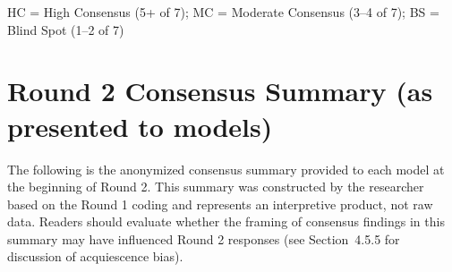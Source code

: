 \documentclass[preprint,review,12pt]{elsarticle}
\begin{document}
\begin{table}[htbp]
\centering
{}%

\vspace{0.5em}
\noindent\small HC = High Consensus (5+ of 7); MC = Moderate Consensus (3--4 of 7); BS = Blind Spot (1--2 of 7)
\end{table}


\section{Round 2 Consensus Summary (as presented to models)}
\label{sec:appendix_e}

The following is the anonymized consensus summary provided to each model at the beginning of Round 2. This summary was constructed by the researcher based on the Round 1 coding and represents an interpretive product, not raw data. Readers should evaluate whether the framing of consensus findings in this summary may have influenced Round 2 responses (see Section~4.5.5 for discussion of acquiescence bias).
\end{document}
